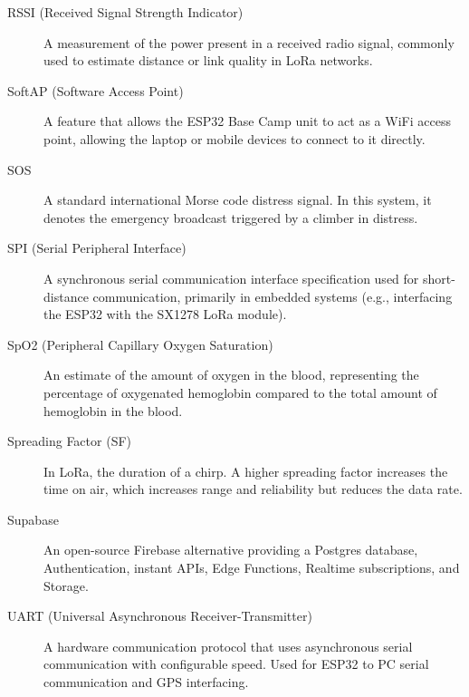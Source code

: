 \begin{description}
\item[RSSI (Received Signal Strength Indicator)] A measurement of the power present in a received radio signal, commonly used to estimate distance or link quality in LoRa networks.
\item[SoftAP (Software Access Point)] A feature that allows the ESP32 Base Camp unit to act as a WiFi access point, allowing the laptop or mobile devices to connect to it directly.
\item[SOS] A standard international Morse code distress signal. In this system, it denotes the emergency broadcast triggered by a climber in distress.
\item[SPI (Serial Peripheral Interface)] A synchronous serial communication interface specification used for short-distance communication, primarily in embedded systems (e.g., interfacing the ESP32 with the SX1278 LoRa module).
\item[SpO2 (Peripheral Capillary Oxygen Saturation)] An estimate of the amount of oxygen in the blood, representing the percentage of oxygenated hemoglobin compared to the total amount of hemoglobin in the blood.
\item[Spreading Factor (SF)] In LoRa, the duration of a chirp. A higher spreading factor increases the time on air, which increases range and reliability but reduces the data rate.
\item[Supabase] An open-source Firebase alternative providing a Postgres database, Authentication, instant APIs, Edge Functions, Realtime subscriptions, and Storage.
\item[UART (Universal Asynchronous Receiver-Transmitter)] A hardware communication protocol that uses asynchronous serial communication with configurable speed. Used for ESP32 to PC serial communication and GPS interfacing.

\end{description}
